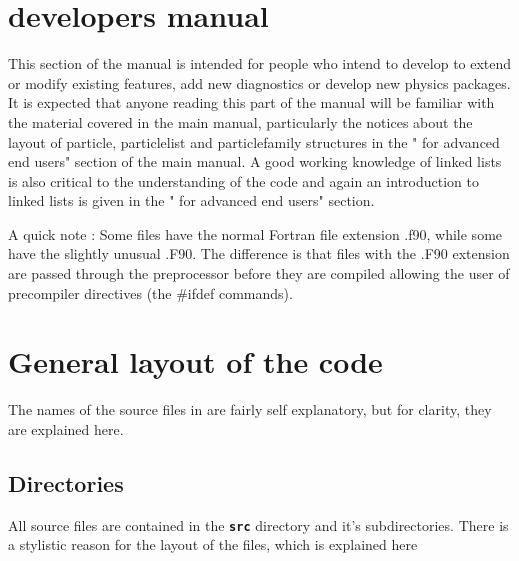 \documentclass[12pt,a4paper]{article}
\newcommand{\inlinecode}[1]{{\color{warwickred} \bf\texttt{#1}}}
\newcommand{\EPOCH}{{\color{warwickdark}\fontfamily{phv}\selectfont{EPOCH}}}
\begin{document}
\section{{\EPOCH} developers manual}
This section of the manual is intended for people who intend to develop {\EPOCH}
to extend or modify existing features, add new diagnostics or develop new
physics packages. It is expected that anyone reading this part of the manual
will be familiar with the material covered in the main manual, particularly
the notices about the layout of particle, particlelist and particlefamily
structures in the "{\EPOCH} for advanced end users" section of the main
manual. A good working knowledge of linked lists is also critical to the
understanding of the code and again an introduction to linked lists is given
in the "{\EPOCH} for advanced end users" section.

A quick note : Some files have the normal Fortran file extension .f90, while
some have the slightly unusual .F90. The difference is that files with the
.F90 extension are passed through the preprocessor before they are compiled
allowing the user of precompiler directives (the \#ifdef commands).

\section{General layout of the {\EPOCH} code}

The names of the source files in {\EPOCH} are fairly self explanatory, but for
clarity, they are explained here.

\subsection{Directories}
All source files are contained in the \inlinecode{src} directory and it's
subdirectories. There is a stylistic reason for the layout of the files, which
is explained here
\end{document}

